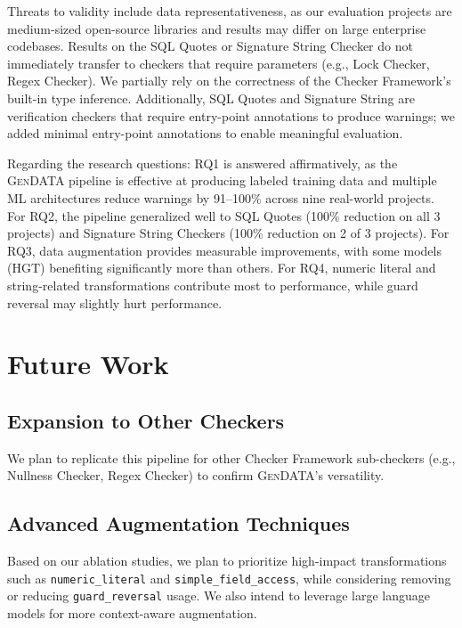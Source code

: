 \documentclass[acmsmall,screen,review,anonymous]{acmart}
\newcommand{\gendata}{\textsc{GenDATA}\xspace}
\newcommand{\cf}{Checker Framework\xspace}
\begin{document}
Threats to validity include data representativeness, as our evaluation projects are medium-sized open-source libraries and results may differ on large enterprise codebases. Results on the SQL Quotes or Signature String Checker do not immediately transfer to checkers that require parameters (e.g., Lock Checker, Regex Checker). We partially rely on the correctness of the \cf's built-in type inference. Additionally, SQL Quotes and Signature String are verification checkers that require entry-point annotations to produce warnings; we added minimal entry-point annotations to enable meaningful evaluation.

Regarding the research questions: RQ1 is answered affirmatively, as the \gendata pipeline is effective at producing labeled training data and multiple ML architectures reduce warnings by 91--100\% across nine real-world projects. For RQ2, the pipeline generalized well to SQL Quotes (100\% reduction on all 3 projects) and Signature String Checkers (100\% reduction on 2 of 3 projects). For RQ3, data augmentation provides measurable improvements, with some models (HGT) benefiting significantly more than others. For RQ4, numeric literal and string-related transformations contribute most to performance, while guard reversal may slightly hurt performance.

\section{Future Work}
\label{sec:future}

\subsection{Expansion to Other Checkers}
\label{sec:expansion}

We plan to replicate this pipeline for other \cf sub-checkers (e.g., Nullness Checker, Regex Checker) to confirm \gendata's versatility.

\subsection{Advanced Augmentation Techniques}
\label{sec:advancedaug}

Based on our ablation studies, we plan to prioritize high-impact transformations such as \texttt{numeric\_literal} and \texttt{simple\_field\_access}, while considering removing or reducing \texttt{guard\_reversal} usage. We also intend to leverage large language models for more context-aware augmentation.
\end{document}
